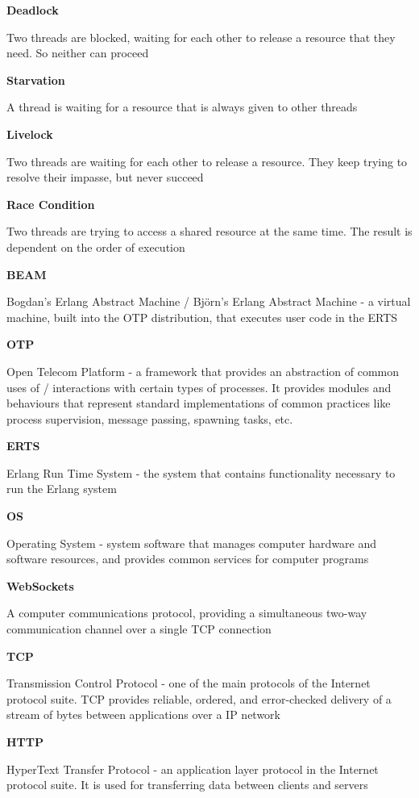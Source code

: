 \documentclass[]{final}
\begin{document}
\textbf{Deadlock}

Two threads are blocked, waiting for each other to release a resource that they need. So neither can proceed

\textbf{Starvation}

A thread is waiting for a resource that is always given to other threads

\textbf{Livelock}

Two threads are waiting for each other to release a resource. They keep trying to resolve their impasse, but never succeed

\textbf{Race Condition}

Two threads are trying to access a shared resource at the same time. The result is dependent on the order of execution

\textbf{BEAM}

Bogdan's Erlang Abstract Machine / Björn's Erlang Abstract Machine - a virtual machine, built into the OTP
distribution, that executes user code in the ERTS

\textbf{OTP}

Open Telecom Platform - a framework that provides an abstraction of common uses of / interactions with
certain types of processes. It provides modules and behaviours that represent standard implementations of
common practices like process supervision, message passing, spawning tasks, etc.

\textbf{ERTS}

Erlang Run Time System - the system that contains functionality necessary to run the Erlang system

\textbf{OS}

Operating System - system software that manages computer hardware and software resources, and
provides common services for computer programs

\textbf{WebSockets}

A computer communications protocol, providing a simultaneous two-way communication channel
over a single TCP connection

\textbf{TCP}

Transmission Control Protocol - one of the main protocols of the Internet protocol suite. TCP provides
reliable, ordered, and error-checked delivery of a stream of bytes between applications over a IP network

\textbf{HTTP}

HyperText Transfer Protocol - an application layer protocol in the Internet protocol suite.
It is used for transferring data between clients and servers
\end{document}
